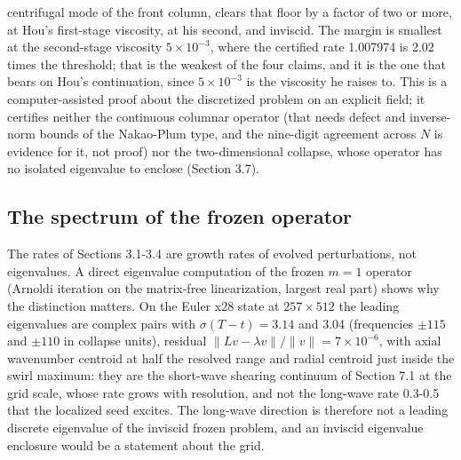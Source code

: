 \documentclass[11pt]{article}
\newcommand{\sn}[2]{#1\times 10^{#2}}
\begin{document}
centrifugal mode of the front column, clears that floor by a factor of two or more, at Hou's first-stage viscosity, at his second, and inviscid. The margin is smallest at the second-stage viscosity $\sn{5}{-3}$, where the certified rate 1.007974 is 2.02 times the threshold; that is the weakest of the four claims, and it is the one that bears on Hou's continuation, since $\sn{5}{-3}$ is the viscosity he raises to. This is a computer-assisted proof about the discretized problem on an explicit field; it certifies neither the continuous columnar operator (that needs defect and inverse-norm bounds of the Nakao-Plum type, and the nine-digit agreement across $N$ is evidence for it, not proof) nor the two-dimensional collapse, whose operator has no isolated eigenvalue to enclose (Section 3.7).

\subsection{The spectrum of the frozen operator}

The rates of Sections 3.1-3.4 are growth rates of evolved perturbations, not eigenvalues. A direct eigenvalue computation of the frozen $m = 1$ operator (Arnoldi iteration on the matrix-free linearization, largest real part) shows why the distinction matters. On the Euler x28 state at $257 \times 512$ the leading eigenvalues are complex pairs with $\sigma (T - t) = 3.14$ and 3.04 (frequencies $\pm 115$ and $\pm 110$ in collapse units), residual $\|L v - \lambda v\| / \|v\| = \sn{7}{-6}$, with axial wavenumber centroid at half the resolved range and radial centroid just inside the swirl maximum: they are the short-wave shearing continuum of Section 7.1 at the grid scale, whose rate grows with resolution, and not the long-wave rate 0.3-0.5 that the localized seed excites. The long-wave direction is therefore not a leading discrete eigenvalue of the inviscid frozen problem, and an inviscid eigenvalue enclosure would be a statement about the grid.
\end{document}
